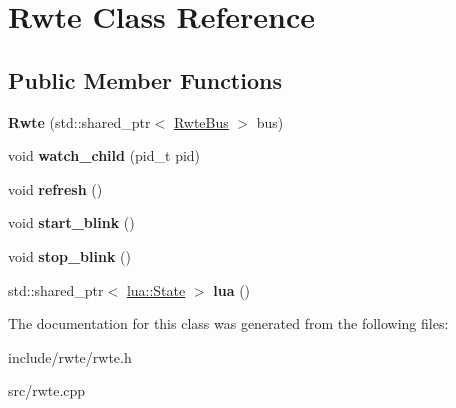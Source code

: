 \hypertarget{classRwte}{}\section{Rwte Class Reference}
\label{classRwte}
\subsection*{Public Member Functions}
\begin{DoxyCompactItemize}
\item 
\mbox{\label{classRwte_a4e7cd69b82a05ad590815287a973344d}} 
{\bfseries Rwte} (std\+::shared\+\_\+ptr$<$ \mbox{\hyperlink{classBus}{Rwte\+Bus}} $>$ bus)
\item 
\mbox{\label{classRwte_a132f97be3fd05c8f7ce68f314000163d}} 
void {\bfseries watch\+\_\+child} (pid\+\_\+t pid)
\item 
\mbox{\label{classRwte_a05bff547640de67f27de3b776c084916}} 
void {\bfseries refresh} ()
\item 
\mbox{\label{classRwte_a4cab27044b80bb124dab5ae6ad267d88}} 
void {\bfseries start\+\_\+blink} ()
\item 
\mbox{\label{classRwte_a97871c10b31df180374883000a7691fa}} 
void {\bfseries stop\+\_\+blink} ()
\item 
\mbox{\label{classRwte_a1b56b07eac8b97dcf9c645bca667c78c}} 
std\+::shared\+\_\+ptr$<$ \mbox{\hyperlink{classlua_1_1State}{lua\+::\+State}} $>$ {\bfseries lua} ()
\end{DoxyCompactItemize}


The documentation for this class was generated from the following files\+:\begin{DoxyCompactItemize}
\item 
include/rwte/rwte.\+h\item 
src/rwte.\+cpp\end{DoxyCompactItemize}
